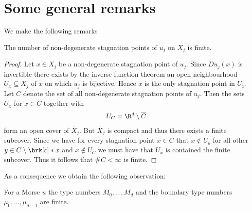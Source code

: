 

\chapter{Some general remarks}

We make the following remarks
\begin{proposition}\label{pr:finiteness_critical_points}
  The number of non-degenerate
  stagnation points of $u_j$ on $X_j$ is finite.
\end{proposition}
\begin{proof}
  Let $x\in X_j$ be a non-degenerate stagnation point of $u_j$. Since $Du_j(x)$ is invertible there exists
  by the inverse function theorem an open neighbourhood $U_x\subseteq X_j$ of $x$ on which 
  $u_j$ is bijective. Hence $x$ is the only stagnation point in $U_x$. Let $C$ denote the set of all
  non-degenerate stagnation points of $u_j$. Then the sets $U_x$ for $x\in C$ together with
  \begin{align}
    U_C=\R^d\setminus \overline{C}
  \end{align}
  form an open cover of $\overline{X}_j$. But $\overline{X}_j$ is compact and thus there exists
  a finite subcover. Since we have for every stagnation point $x\in C$ that
  $x\not\in U_y$ for all other $y\in C\setminus\brk[c]*{x}$ and $x\not\in U_C$ we must have that $U_x$
  is contained the finite subcover. Thus it follows that $\#C<\infty$ is finite.
\end{proof}
As a consequence we obtain the following observation:
\begin{corollary}\label{co:finiteness_type_nbrs}
  For a Morse $u$ the type numbers $M_0,\dots,M_d$ and the boundary type numbers $\mu_0,\dots,\mu_{d-1}$
  are finite.
\end{corollary}

